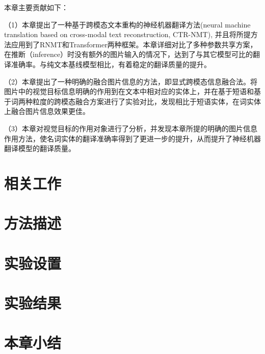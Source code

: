 本章主要贡献如下：

（1）本章提出了一种基于跨模态文本重构的神经机器翻译方法(neural machine translation based on cross-modal text reconstruction, CTR-NMT), 并且将所提方法应用到了RNMT和Transformer两种框架。本章详细对比了多种参数共享方案，在推断（inference）时没有额外的图片输入的情况下，达到了与其它模型可比的翻译准确率。与纯文本基线模型相比，有着稳定的翻译质量的提升。

（2）本章提出了一种明确的融合图片信息的方法，即显式跨模态信息融合法。将图片中的视觉目标信息明确的作用到在文本中相对应的实体上，并在基于短语和基于词两种粒度的跨模态融合方案进行了实验对比，发现相比于短语实体，在词实体上融合图片信息效果更佳。

（3）本章对视觉目标的作用对象进行了分析，并发现本章所提的明确的图片信息作用方法，使名词实体的翻译准确率得到了更进一步的提升，从而提升了神经机器翻译模型的翻译质量。


\section{相关工作}

\section{方法描述}

\section{实验设置}

\section{实验结果}

\section{本章小结}
